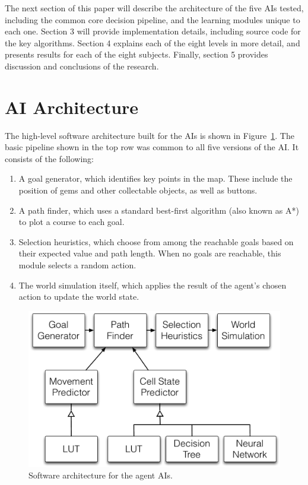 \documentclass{article}
\begin{document}
The next section of this paper will describe the architecture of the five AIs tested, including the common core decision pipeline, and the learning modules unique to each one.  Section 3 will provide implementation details, including source code for the key algorithms.  Section 4 explains each of the eight levels in more detail, and presents results for each of the eight subjects.  Finally, section 5 provides discussion and conclusions of the research.

\section{AI Architecture}

The high-level software architecture built for the AIs is shown in Figure~\ref{figArchitecture}.  The basic pipeline shown in the top row was common to all five versions of the AI.  It consists of the following:

\begin{enumerate}
\item A goal generator, which identifies key points in the map.  These include the position of gems and other collectable objects, as well as buttons.
\item A path finder, which uses a standard best-first algorithm (also known as A*) to plot a course to each goal.
\item Selection heuristics, which choose from among the reachable goals based on their expected value and path length.  When no goals are reachable, this module selects a random action.
\item The world simulation itself, which applies the result of the agent's chosen action to update the world state.
\end{enumerate}

\begin{figure}
  \begin{center}
    \includegraphics[width=4.5in]{figArchitecture.pdf}
    \caption{Software architecture for the agent AIs.}
    \label{figArchitecture}
  \end{center}
\end{figure}
\end{document}
